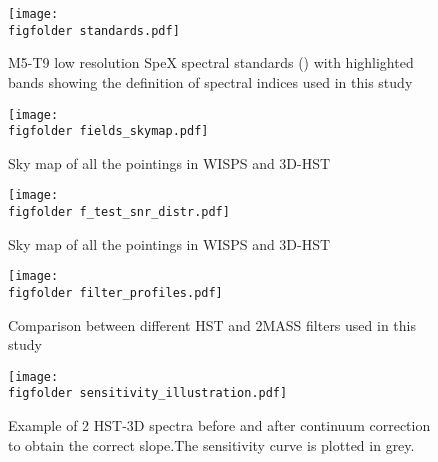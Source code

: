 \newcommand{\figfolder}{/users/caganze/research/wisps/figures/}






\begin{figure*}
    \centering
    \texttt{[image: \\figfolder standards.pdf]}
    \caption{M5-T9 low resolution SpeX spectral standards (\citealt{2010ApJS..190..100K}) with highlighted bands showing the definition of spectral indices used in this study}
    \label{fig:indexdefinition}
\end{figure*}



\begin{figure*}
    \centering
    \texttt{[image: \\figfolder fields\_skymap.pdf]}
    \caption{Sky map of all the pointings in WISPS and 3D-HST}
    \label{fig:skymap}
\end{figure*}

\begin{figure*}
    \centering
    \texttt{[image: \\figfolder f\_test\_snr\_distr.pdf]}
    \caption{Sky map of all the pointings in WISPS and 3D-HST}
    \label{fig:skymap}
\end{figure*}



\begin{figure*}
    \centering
    \texttt{[image: \\figfolder filter\_profiles.pdf]}
    \caption{Comparison between different HST and 2MASS filters used in this study}
    \label{fig:filterprofiles}
\end{figure*}



\begin{figure*}
\centering
\texttt{[image: \\figfolder sensitivity\_illustration.pdf]}
\caption{ Example of 2 HST-3D spectra before and after continuum correction to obtain the correct slope.The sensitivity curve is plotted in grey.}
\label{fig:sensitivity}
\end{figure*}

